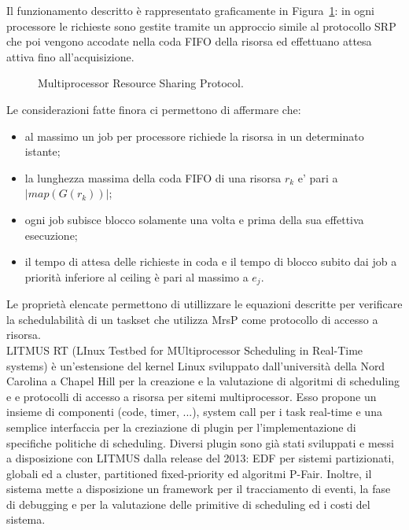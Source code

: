 Il funzionamento descritto è rappresentato graficamente in Figura~\ref{fig:locks.mrsp}: in ogni processore le richieste sono gestite tramite un approccio simile al protocollo SRP che poi vengono accodate nella coda FIFO della risorsa ed effettuano attesa attiva fino all'acquisizione.\\

\begin{figure}
\centering
{}
\caption{Multiprocessor Resource Sharing Protocol.}
\label{fig:locks.mrsp}
\end{figure}

Le considerazioni fatte finora ci permettono di affermare che:

\begin{itemize}
\item al massimo un job per processore richiede la risorsa in un determinato istante;
\item la lunghezza massima della coda FIFO di una risorsa $r_k$ e’ pari a $| map(G(r_k)) |$;
\item ogni job subisce blocco solamente una volta e prima della sua effettiva esecuzione;
\item il tempo di attesa delle richieste in coda e il tempo di blocco subito dai job a priorità inferiore al ceiling  è pari al massimo a $e_j$.
\end{itemize}

Le proprietà elencate permettono di utillizzare le equazioni descritte per verificare la schedulabilità di un taskset che utilizza MrsP come protocollo di accesso a risorsa.\\







LITMUS RT (LInux Testbed for MUltiprocessor Scheduling in Real-Time systems) è un'estensione del kernel Linux sviluppato dall'università della Nord Carolina a Chapel Hill per la creazione e la valutazione di algoritmi di scheduling e e protocolli di accesso a risorsa per sitemi multiprocessor. Esso propone un insieme di componenti (code, timer, ...), system call per i task real-time e una semplice interfaccia per la creziazione di plugin per l'implementazione di specifiche politiche di scheduling. Diversi plugin sono già stati sviluppati e messi a disposizione con LITMUS dalla release del 2013: EDF per sistemi partizionati, globali ed a cluster, partitioned fixed-priority ed algoritmi P-Fair. Inoltre, il sistema mette a disposizione un framework per il tracciamento di eventi, la fase di debugging e per la valutazione delle primitive di scheduling ed i costi del sistema.

